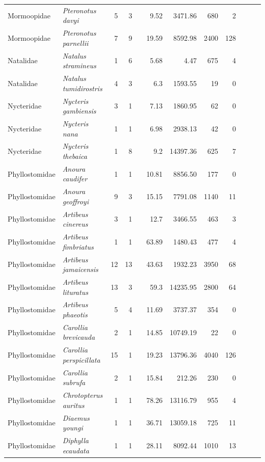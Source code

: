\begin{landscape}
\begin{longtable}{@{}llrrrrrrrrrl@{}}
  Mormoopidae & \emph{Pteronotus davyi} & 5 & 3 &  & 9.52 & 3471.86 & 680 & 2 &  &  &  \\ 
  Mormoopidae & \emph{Pteronotus parnellii} & 7 & 9 &  & 19.59 & 8592.98 & 2400 & 128 &  &  &  \\ 
  Natalidae & \emph{Natalus stramineus} & 1 & 6 &  & 5.68 & 4.47 & 675 & 4 &  &  &  \\ 
  Natalidae & \emph{Natalus tumidirostris} & 4 & 3 &  & 6.3 & 1593.55 & 19 & 0 &  &  &  \\ 
  Nycteridae & \emph{Nycteris gambiensis} & 3 & 1 &  & 7.13 & 1860.95 & 62 & 0 &  &  &  \\ 
  Nycteridae & \emph{Nycteris nana} & 1 & 1 &  & 6.98 & 2938.13 & 42 & 0 &  &  &  \\ 
  Nycteridae & \emph{Nycteris thebaica} & 1 & 8 &  & 9.2 & 14397.36 & 625 & 7 &  &  &  \\ 
  Phyllostomidae & \emph{Anoura caudifer} & 1 & 1 &  & 10.81 & 8856.50 & 177 & 0 &  &  &  \\ 
  Phyllostomidae & \emph{Anoura geoffroyi} & 9 & 3 &  & 15.15 & 7791.08 & 1140 & 11 &  &  &  \\ 
  Phyllostomidae & \emph{Artibeus cinereus} & 3 & 1 &  & 12.7 & 3466.55 & 463 & 3 &  &  &  \\ 
  Phyllostomidae & \emph{Artibeus fimbriatus} & 1 & 1 &  & 63.89 & 1480.43 & 477 & 4 &  &  &  \\ 
  Phyllostomidae & \emph{Artibeus jamaicensis} & 12 & 13 &  & 43.63 & 1932.23 & 3950 & 68 &  &  &  \\ 
  Phyllostomidae & \emph{Artibeus lituratus} & 13 & 3 &  & 59.3 & 14235.95 & 2800 & 64 &  &  &  \\ 
  Phyllostomidae & \emph{Artibeus phaeotis} & 5 & 4 &  & 11.69 & 3737.37 & 354 & 0 &  &  &  \\ 
  Phyllostomidae & \emph{Carollia brevicauda} & 2 & 1 &  & 14.85 & 10749.19 & 22 & 0 &  &  &  \\ 
  Phyllostomidae & \emph{Carollia perspicillata} & 15 & 1 &  & 19.23 & 13796.36 & 4040 & 126 &  &  &  \\ 
  Phyllostomidae & \emph{Carollia subrufa} & 2 & 1 &  & 15.84 & 212.26 & 230 & 0 &  &  &  \\ 
  Phyllostomidae & \emph{Chrotopterus auritus} & 1 & 1 &  & 78.26 & 13116.79 & 955 & 4 &  &  &  \\ 
  Phyllostomidae & \emph{Diaemus youngi} & 1 & 1 &  & 36.71 & 13059.18 & 725 & 11 &  &  &  \\ 
  Phyllostomidae & \emph{Diphylla ecaudata} & 1 & 1 &  & 28.11 & 8092.44 & 1010 & 13 &  &  &  \\ 

\end{longtable}
\end{landscape}
